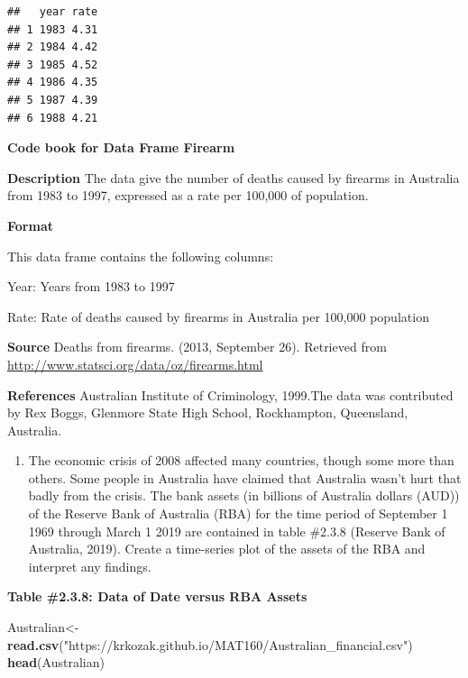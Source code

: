 \documentclass[
]{book}
\newenvironment{Shaded}{\begin{snugshade}}{\end{snugshade}}
\newcommand{\KeywordTok}[1]{\textcolor[rgb]{0.13,0.29,0.53}{\textbf{#1}}}
\newcommand{\NormalTok}[1]{#1}
\newcommand{\StringTok}[1]{\textcolor[rgb]{0.31,0.60,0.02}{#1}}
\providecommand{\tightlist}{%
  \setlength{\itemsep}{0pt}\setlength{\parskip}{0pt}}
\begin{document}
\begin{verbatim}
##   year rate
## 1 1983 4.31
## 2 1984 4.42
## 3 1985 4.52
## 4 1986 4.35
## 5 1987 4.39
## 6 1988 4.21
\end{verbatim}

\textbf{Code book for Data Frame Firearm}

\textbf{Description}
The data give the number of deaths caused by firearms in Australia from 1983 to 1997, expressed as a rate per 100,000 of population.

\textbf{Format}

This data frame contains the following columns:

Year: Years from 1983 to 1997

Rate: Rate of deaths caused by firearms in Australia per 100,000 population

\textbf{Source}
Deaths from firearms. (2013, September 26). Retrieved from
\url{http://www.statsci.org/data/oz/firearms.html}

\textbf{References}
Australian Institute of Criminology, 1999.The data was contributed by Rex Boggs, Glenmore State High School, Rockhampton, Queensland, Australia.

\begin{enumerate}
\def\labelenumi{\arabic{enumi}.}
\setcounter{enumi}{5}
\tightlist
\item
  The economic crisis of 2008 affected many countries, though some more than others. Some people in Australia have claimed that Australia wasn't hurt that badly from the crisis. The bank assets (in billions of Australia dollars (AUD)) of the Reserve Bank of Australia (RBA) for the time period of September 1 1969 through March 1 2019 are contained in table \#2.3.8 (Reserve Bank of Australia, 2019). Create a time-series plot of the assets of the RBA and interpret any findings.
\end{enumerate}

\textbf{Table \#2.3.8: Data of Date versus RBA Assets}

\begin{Shaded}
\begin{Highlighting}[]
\NormalTok{Australian<-}\StringTok{ }\KeywordTok{read.csv}\NormalTok{(}\StringTok{"https://krkozak.github.io/MAT160/Australian_financial.csv"}\NormalTok{)}
\KeywordTok{head}\NormalTok{(Australian)}
\end{Highlighting}
\end{Shaded}
\end{document}
